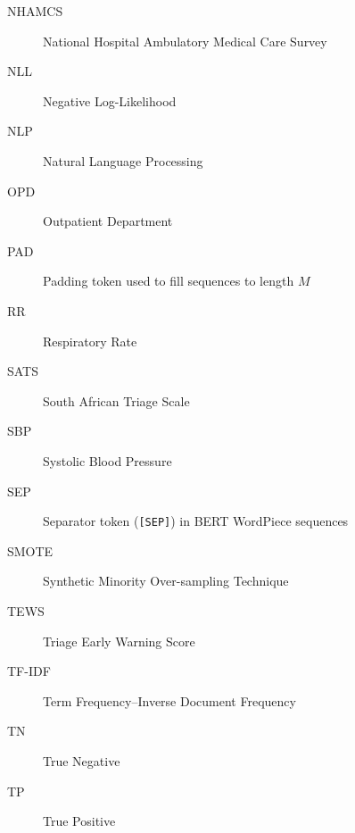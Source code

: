 \begin{description}
\item[NHAMCS] National Hospital Ambulatory Medical Care Survey
\item[NLL] Negative Log-Likelihood
\item[NLP] Natural Language Processing
\item[OPD] Outpatient Department
\item[PAD] Padding token used to fill sequences to length \(M\)
\item[RR] Respiratory Rate
\item[SATS] South African Triage Scale
\item[SBP] Systolic Blood Pressure
\item[SEP] Separator token (\texttt{[SEP]}) in BERT WordPiece sequences
\item[SMOTE] Synthetic Minority Over-sampling Technique
\item[TEWS] Triage Early Warning Score
\item[TF-IDF] Term Frequency--Inverse Document Frequency
\item[TN] True Negative
\item[TP] True Positive
\end{description}
